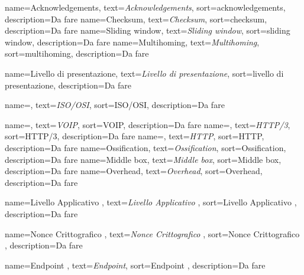  {
    name=Acknowledgements,
    text=\emph{Acknowledgements},
    sort=acknowledgements,
    description={Da fare}
}
 {
    name=Checksum,
    text=\emph{Checksum},
    sort=checksum,
    description={Da fare}
}
 {
    name=Sliding window,
    text=\emph{Sliding window},
    sort=sliding window,
    description={Da fare}
}
 {
    name=Multihoming,
    text=\emph{Multihoming},
    sort=multihoming,
    description={Da fare}
}

 {
    name=Livello di presentazione,
    text=\emph{Livello di presentazione},
    sort=livello di presentazione,
    description={Da fare}
}

 {
    name=,
    text=\emph{ISO/OSI},
    sort=ISO/OSI,
    description={Da fare}
}

 {
    name=,
    text=\emph{VOIP},
    sort=VOIP,
    description={Da fare}
}
 {
    name=,
    text=\emph{HTTP/3},
    sort=HTTP/3,
    description={Da fare}
}
 {
    name=,
    text=\emph{HTTP},
    sort=HTTP,
    description={Da fare}
}
 {
    name=Ossification,
    text=\emph{Ossification},
    sort=Ossification,
    description={Da fare}
}
 {
    name=Middle box,
    text=\emph{Middle box},
    sort=Middle box,
    description={Da fare}
}
 {
    name=Overhead,
    text=\emph{Overhead},
    sort=Overhead,
    description={Da fare}
}

 {
    name=Livello Applicativo ,
    text=\emph{Livello Applicativo },
    sort=Livello Applicativo ,
    description={Da fare}
}

 {
    name=Nonce Crittografico ,
    text=\emph{Nonce Crittografico },
    sort=Nonce Crittografico ,
    description={Da fare}
}

 {
    name=Endpoint ,
    text=\emph{Endpoint},
    sort=Endpoint ,
    description={Da fare}
}

